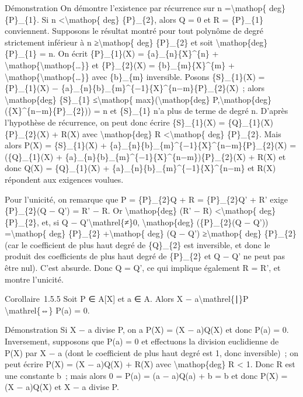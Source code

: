 \documentclass[]{article}
\begin{document}
Démonstration On démontre l'existence par récurrence sur n
=\textbackslash{}mathop\{ deg\} \{P\}\_\{1\}. Si n
\textless{}\textbackslash{}mathop\{ deg\} \{P\}\_\{2\}, alors Q = 0 et R
= \{P\}\_\{1\} conviennent. Supposons le résultat montré pour tout
polynôme de degré strictement inférieur à n ≥\textbackslash{}mathop\{
deg\} \{P\}\_\{2\} et soit \textbackslash{}mathop\{deg\} \{P\}\_\{1\} =
n. On écrit \{P\}\_\{1\}(X) = \{a\}\_\{n\}\{X\}\^{}\{n\} +
\textbackslash{}mathop\{\textbackslash{}mathop\{\ldots{}\}\} et
\{P\}\_\{2\}(X) = \{b\}\_\{m\}\{X\}\^{}\{m\} +
\textbackslash{}mathop\{\textbackslash{}mathop\{\ldots{}\}\} avec
\{b\}\_\{m\} inversible. Posons \{S\}\_\{1\}(X) = \{P\}\_\{1\}(X) −
\{a\}\_\{n\}\{b\}\_\{m\}\^{}\{−1\}\{X\}\^{}\{n−m\}\{P\}\_\{2\}(X)~;
alors \textbackslash{}mathop\{deg\} \{S\}\_\{1\}
≤\textbackslash{}mathop\{ max\}(\textbackslash{}mathop\{deg\}
P,\textbackslash{}mathop\{deg\} (\{X\}\^{}\{n−m\}\{P\}\_\{2\})) = n et
\{S\}\_\{1\} n'a plus de terme de degré n. D'après l'hypothèse de
récurrence, on peut donc écrire \{S\}\_\{1\}(X) =
\{Q\}\_\{1\}(X)\{P\}\_\{2\}(X) + R(X) avec \textbackslash{}mathop\{deg\}
R \textless{}\textbackslash{}mathop\{ deg\} \{P\}\_\{2\}. Mais alors
P(X) = \{S\}\_\{1\}(X) +
\{a\}\_\{n\}\{b\}\_\{m\}\^{}\{−1\}\{X\}\^{}\{n−m\}\{P\}\_\{2\}(X) =
(\{Q\}\_\{1\}(X) +
\{a\}\_\{n\}\{b\}\_\{m\}\^{}\{−1\}\{X\}\^{}\{n−m\})\{P\}\_\{2\}(X) +
R(X) et donc Q(X) = \{Q\}\_\{1\}(X) +
\{a\}\_\{n\}\{b\}\_\{m\}\^{}\{−1\}\{X\}\^{}\{n−m\} et R(X) répondent aux
exigences voulues.

Pour l'unicité, on remarque que P = \{P\}\_\{2\}Q + R = \{P\}\_\{2\}Q' +
R' exige \{P\}\_\{2\}(Q − Q') = R' − R. Or \textbackslash{}mathop\{deg\}
(R' − R) \textless{}\textbackslash{}mathop\{ deg\} \{P\}\_\{2\}, et, si
Q − Q'\textbackslash{}mathrel\{≠\}0, \textbackslash{}mathop\{deg\}
(\{P\}\_\{2\}(Q − Q')) =\textbackslash{}mathop\{ deg\} \{P\}\_\{2\}
+\textbackslash{}mathop\{ deg\} (Q − Q') ≥\textbackslash{}mathop\{ deg\}
\{P\}\_\{2\} (car le coefficient de plus haut degré de \{Q\}\_\{2\} est
inversible, et donc le produit des coefficients de plus haut degré de
\{P\}\_\{2\} et Q − Q' ne peut pas être nul). C'est absurde. Donc Q =
Q', ce qui implique également R = R', et montre l'unicité.

Corollaire~1.5.5 Soit P ∈ A{[}X{]} et a ∈ A. Alors X −
a\textbackslash{}mathrel\{∣\}P \textbackslash{}mathrel\{⇔\} P(a) = 0.

Démonstration Si X − a divise P, on a P(X) = (X − a)Q(X) et donc P(a) =
0. Inversement, supposons que P(a) = 0 et effectuons la division
euclidienne de P(X) par X − a (dont le coefficient de plus haut degré
est 1, donc inversible)~; on peut écrire P(X) = (X − a)Q(X) + R(X) avec
\textbackslash{}mathop\{deg\} R \textless{} 1. Donc R est une constante
b~; mais alors 0 = P(a) = (a − a)Q(a) + b = b et donc P(X) = (X − a)Q(X)
et X − a divise P.
\end{document}
